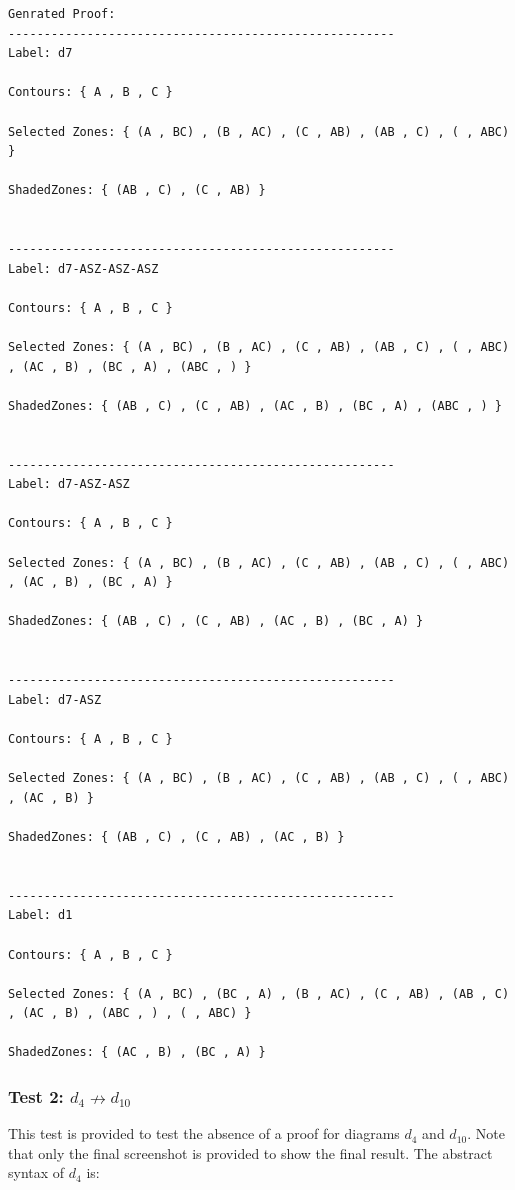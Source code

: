 \documentclass[10pt, a4paper, titlepage]{article}
\begin{document}
\small
\begin{lstlisting}
Genrated Proof:
------------------------------------------------------
Label: d7

Contours: { A , B , C } 

Selected Zones: { (A , BC) , (B , AC) , (C , AB) , (AB , C) , ( , ABC) }  

ShadedZones: { (AB , C) , (C , AB) } 


------------------------------------------------------
Label: d7-ASZ-ASZ-ASZ

Contours: { A , B , C } 

Selected Zones: { (A , BC) , (B , AC) , (C , AB) , (AB , C) , ( , ABC) , (AC , B) , (BC , A) , (ABC , ) }  

ShadedZones: { (AB , C) , (C , AB) , (AC , B) , (BC , A) , (ABC , ) } 


------------------------------------------------------
Label: d7-ASZ-ASZ

Contours: { A , B , C } 

Selected Zones: { (A , BC) , (B , AC) , (C , AB) , (AB , C) , ( , ABC) , (AC , B) , (BC , A) }  

ShadedZones: { (AB , C) , (C , AB) , (AC , B) , (BC , A) } 


------------------------------------------------------
Label: d7-ASZ

Contours: { A , B , C } 

Selected Zones: { (A , BC) , (B , AC) , (C , AB) , (AB , C) , ( , ABC) , (AC , B) }  

ShadedZones: { (AB , C) , (C , AB) , (AC , B) } 


------------------------------------------------------
Label: d1

Contours: { A , B , C } 

Selected Zones: { (A , BC) , (BC , A) , (B , AC) , (C , AB) , (AB , C) , (AC , B) , (ABC , ) , ( , ABC) }  

ShadedZones: { (AC , B) , (BC , A) } 
\end{lstlisting}
\large

\subsubsection{Test 2: $ d_{4} \nrightarrow  d_{10} $}
This test is provided to test the absence of a proof for diagrams $ d_{4} $ and $ d_{10} $. Note that only the final screenshot is provided to show the final result. The abstract syntax of $ d_{4} $ is:
\end{document}
